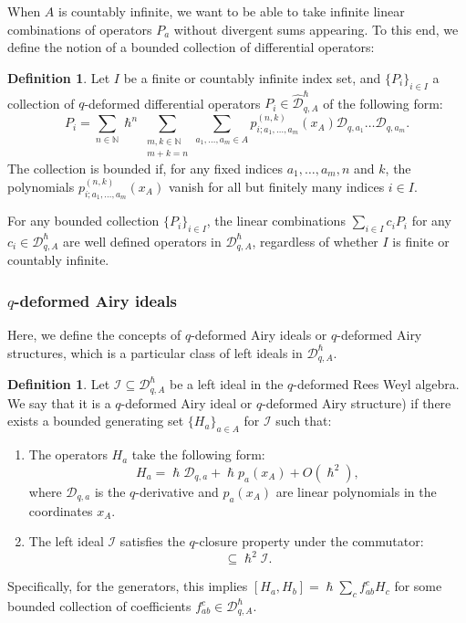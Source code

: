 \documentclass[reqno,11pt]{amsart}
\theoremstyle{plain}
\theoremstyle{definition}
\newtheorem{definition}[theorem]{Definition}
\theoremstyle{remark}
\numberwithin{equation}{section}
\newcommand{\1}{\mathds{1}}
\newcommand{\2}{\frac{1}{2}}
\begin{document}
				When $A$ is countably infinite, we want to be able to take infinite linear combinations of operators $P_a$ without divergent sums appearing. To this end, we define the notion of a bounded collection of differential operators:
				\begin{definition}\label{def:bounded}
					Let $I$ be a finite or countably infinite index set, and $\{P_i\}_{i \in I}$ a collection of  $q$-deformed differential operators {$P_i \in\widehat{\mathcal{D}}_{q,A}^\hslash$} of the following form:
					\begin{equation}
						P_i = \sum_{n \in \mathbb N} \hslash^n \sum_{\substack{m,k \in \mathbb N \\ m+k = n} }\sum_{a_1,\ldots, a_m \in A} p^{(n,k)}_{i;a_1,\ldots, a_m}(x_A)\mathcal{D}_{q,a_1} \ldots\mathcal{D}_{q,a_m}.
					\end{equation}
					The collection is bounded if, for any fixed  indices $ a_1,\ldots, a_m, n  $ and $ k $, the polynomials  $ p^{(n,k)}_{i;a_1,\ldots, a_m}(x_A) $ vanish for all but finitely many indices $ i \in I $.
				\end{definition} 
				For any bounded collection $\{P_i\}_{i \in I}$, the linear combinations $\sum_{i \in I} c_i P_i$ for any {$c_i \in \mathcal{D}_{q,A}^\hslash$} are well defined operators in {$\mathcal{D}_{q,A}^\hslash$}, regardless of whether $I$ is finite or countably infinite.
				\subsubsection{$q$-deformed Airy ideals}
				Here, we  define the concepts of $q$-deformed Airy ideals or $q$-deformed Airy structures, which is a particular class of left ideals in {$\mathcal{D}_{q,A}^\hslash$}. 
				\begin{definition}\label{d:airy}
					Let {$\mathcal{I} \subseteq\mathcal{D}_{q,A}^\hslash$} be a left ideal {in the  $q$-deformed Rees Weyl algebra}. We say that it is a $q$-deformed Airy ideal or  $q$-deformed Airy structure) if there exists a bounded generating set $\{H_a \}_{a \in A}$ for $\mathcal{I}$ such that:
					\begin{enumerate}
						\item The operators $H_a$ take the following form:
						\begin{equation}\label{eq:form}
							H_a = \hslash \mathcal{D}_{q,a} + \hslash p_a(x_A) + O(\hslash^2),
						\end{equation}
						where {$\mathcal{D}_{q,a}$ is the  $q$-derivative and $p_a(x_A)$ are linear polynomials in the coordinates $x_A$.}
						\item The left ideal $\mathcal{I}$ satisfies {the $q$-closure property under the commutator}:
						{\begin{equation}
								[ \mathcal{I}, \mathcal{I}] \subseteq \hslash^2 \mathcal{I}.
						\end{equation}}
					\end{enumerate}
					{
						Specifically, for the generators, this implies $[H_a, H_b] = \hslash \sum_c f_{ab}^c H_c$ for some bounded collection of coefficients $f_{ab}^c \in \mathcal{D}_{q,A}^\hslash$.}
				\end{definition}    
\end{document}
